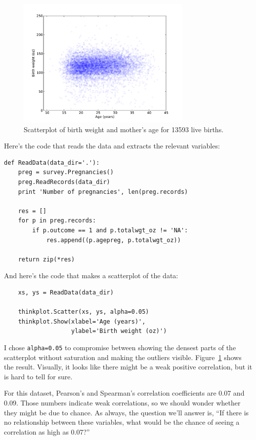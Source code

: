 \documentclass[12pt]{book}
\begin{document}
\begin{figure}
\centerline{\includegraphics[height=2.5in]{figs/correlate1.pdf}}
\caption{Scatterplot of birth weight and mother's age for 13593 live
births.}
\label{correlate1}
\end{figure}

Here's the code that reads the data and extracts the relevant
variables:

\begin{verbatim}
def ReadData(data_dir='.'):
    preg = survey.Pregnancies()
    preg.ReadRecords(data_dir)
    print 'Number of pregnancies', len(preg.records)

    res = []
    for p in preg.records:
        if p.outcome == 1 and p.totalwgt_oz != 'NA':
            res.append((p.agepreg, p.totalwgt_oz))
    
    return zip(*res)
\end{verbatim}

And here's the code that makes a scatterplot of the data:

\begin{verbatim}
    xs, ys = ReadData(data_dir)

    thinkplot.Scatter(xs, ys, alpha=0.05)
    thinkplot.Show(xlabel='Age (years)',
                   ylabel='Birth weight (oz)')
\end{verbatim}

I chose {\tt alpha=0.05} to compromise between showing the densest
parts of the scatterplot without saturation and making the outliers
visible.  Figure~\ref{correlate1} shows the result.  Visually, it looks like
there might be a weak positive correlation, but it is hard to tell for sure.

For this dataset, Pearson's and Spearman's correlation coefficients
are 0.07 and 0.09.  Those numbers indicate weak correlations, so we
should wonder whether they might be due to chance.  As always, the question
we'll answer is, ``If there is no relationship between these variables,
what would be the chance of seeing a correlation as high as 0.07?''
\end{document}
